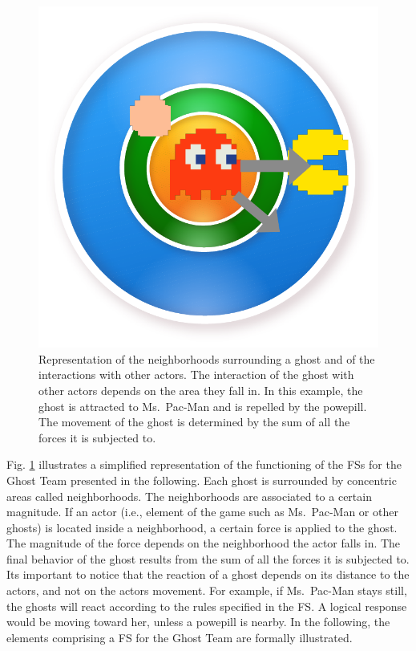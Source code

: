 \documentclass[journal]{IEEEtran}
\begin{document}
\begin{figure}[!t]
  \label{fig:Neigh_interaction}
  \centering
  \includegraphics[scale=0.5]{"neigh_inter"}
  \caption{Representation of the neighborhoods surrounding a ghost and of the interactions with other actors. The interaction of the ghost with other actors depends on the area they fall in. In this example, the ghost is attracted to Ms.\ Pac-Man and is repelled by the powepill. The movement of the ghost is determined by the sum of all the forces it is subjected to.}
\end{figure}

Fig. \ref{fig:Neigh_interaction} illustrates a simplified representation of the functioning of the FSs for the Ghost Team presented in the following. Each ghost is surrounded by concentric areas called neighborhoods. The neighborhoods are associated to a certain magnitude. If an actor (i.e., element of the game such as Ms.\ Pac-Man or other ghosts) is located inside a neighborhood, a certain force is applied to the ghost. The magnitude of the force depends on the neighborhood the actor falls in. The final behavior of the ghost results from the sum of all the forces it is subjected to. Its important to notice that the reaction of a ghost depends on its distance to the actors, and not on the actors movement. For example, if Ms.\ Pac-Man stays still, the ghosts will react according to the rules specified in the FS. A logical response would be moving toward her, unless a powepill is nearby. In the following, the elements comprising a FS for the Ghost Team are formally illustrated.
\end{document}
